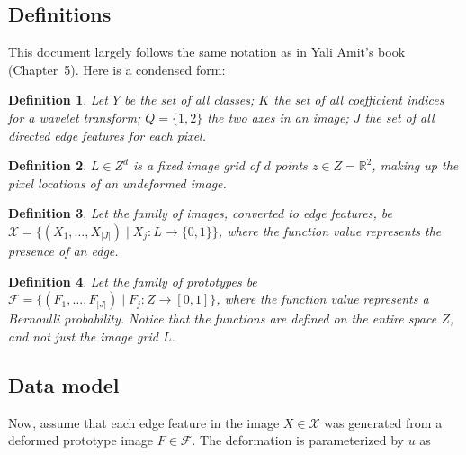 \documentclass{report}
\newtheorem{mydef}{Definition}
\begin{document}
\subsection{Definitions} \label{sec:defs}

This document largely follows the same notation as in Yali Amit's book (Chapter~5). Here is a condensed form: 

\begin{mydef}
Let $Y$ be the set of all classes; $K$ the set of all coefficient indices for a wavelet transform; $Q = \{1,2\}$ the two axes in an image; $J$ the set of all directed edge features for each pixel.%
\end{mydef}

\begin{mydef}
$L \in Z^{d}$ is a fixed image grid of $d$ points $z \in Z = \mathbb{R}^2$, making up the pixel locations of an undeformed image. %
\end{mydef}

\begin{mydef}
Let the family of images, converted to edge features, be $\mathcal{X} = \{ (X_1, \dots, X_{|J|}) \mid X_j : L \rightarrow \{0,1\}\}$, where the function value represents the presence of an edge.%
\end{mydef}

\begin{mydef}
Let the family of prototypes be $\mathcal{F} = \{ (F_1, \dots, F_{|J|}) \mid F_j : Z \rightarrow [0, 1]\}$, where the function value represents a Bernoulli probability. Notice that the functions are defined on the entire space $Z$, and not just the image grid $L$.
\end{mydef}


\subsection{Data model}
Now, assume that each edge feature in the image $X \in \mathcal{X}$ was generated from a deformed prototype image $F \in \mathcal{F}$. The deformation is parameterized by $u$ as
\end{document}

